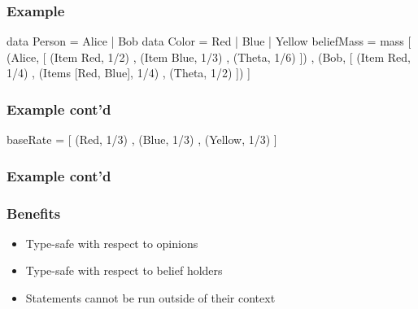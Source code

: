 \documentclass{beamer}
\begin{document}
\begin{frame}[fragile]
\frametitle{Example}

\begin{code}
  data Person = Alice | Bob
  data Color  = Red | Blue | Yellow
  beliefMass  = mass
    [ (Alice, [ (Item Red,  1/2)
              , (Item Blue, 1/3)
              , (Theta,     1/6)
              ])
    , (Bob,   [ (Item Red,          1/4)
              , (Items [Red, Blue], 1/4)
              , (Theta,             1/2)
              ])
    ]
\end{code}

\end{frame}

\begin{frame}[fragile]
\frametitle{Example cont'd}

\begin{code}
  baseRate = [ (Red,    1/3)
             , (Blue,   1/3)
             , (Yellow, 1/3)
             ]
\end{code}

\end{frame}

\begin{frame}[fragile]
\frametitle{Example cont'd}


\end{frame}

\begin{frame}
\frametitle{Benefits}

\begin{itemize}
  \item Type-safe with respect to opinions
  \item Type-safe with respect to belief holders
  \item Statements cannot be run outside of their context
\end{itemize}

\end{frame}

\end{document}
